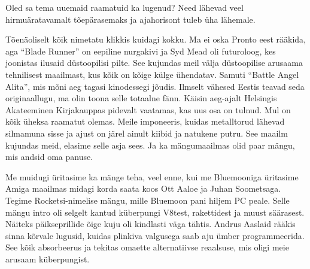 
Oled sa tema uuemaid raamatuid ka lugenud? Need lähevad veel hirmuäratavamalt 
tõepärasemaks ja ajahorisont tuleb üha lähemale.


Tõenäoliselt kõik nimetatu klikkis kuidagi kokku. Ma ei oska 
Pronto eest rääkida, aga \enquote{Blade 
Runner} on eepiline nurgakivi ja Syd Mead oli futuroloog, kes 
joonistas ilusaid düstoopilisi pilte. See kujundas meil välja düstoopilise 
arusaama tehnilisest maailmast, kus kõik on kõige külge ühendatav. Samuti
\enquote{Battle Angel Alita}, mis mõni aeg tagasi kinodessegi jõudis. Ilmselt vähesed Eestis 
teavad seda originaallugu, ma olin toona selle totaalne fänn. Käisin 
aeg-ajalt Helsingis Akateeminen Kirjakauppas pidevalt vaatamas, kas uus osa on tulnud. Mul on kõik üheksa 
raamatut olemas. Meile imponeeris, kuidas metalltorud lähevad silmamuna sisse ja ajust on järel ainult kiibid ja natukene putru. See maailm kujundas meid, elasime selle asja sees. Ja ka mängumaailmas olid paar mängu, mis andsid oma panuse. 

Me muidugi üritasime ka mänge teha, veel enne, kui me 
Bluemooniga  üritasime Amiga maailmas midagi korda saata koos Ott 
Aaloe ja Juhan Soometsaga. Tegime Rocketsi-nimelise mängu, mille 
Bluemoon pani hiljem PC peale. 
Selle mängu intro oli selgelt kantud küberpungi V8test, rakettidest ja muust säärasest. Näiteks päikseprillide õige kuju oli kindlasti väga tähtis. Andrus Aaslaid 
rääkis sinna kõrvale lugusid, kuidas plinkiva valgusega saab 
aju ümber programmeerida. See kõik absorbeerus ja tekitas 
omaette alternatiivse reaalsuse, mis oligi meie arusaam 
küberpungist. 

